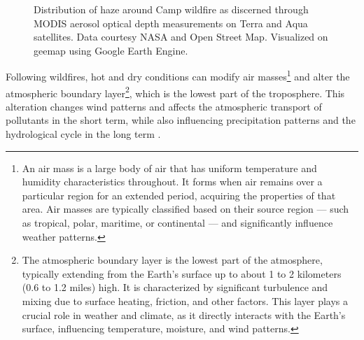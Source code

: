 \documentclass[
  12 pt,
]{Nemilov}
\begin{document}
\begin{figure}

{\centering {}\hfill{}\newline{}\hfill{}\newline

}

\caption[Distribution of haze around Camp wildfire as discerned through MODIS aerosol optical depth measurements on Terra and Aqua satellites.]{Distribution of haze around Camp wildfire as discerned through MODIS aerosol optical depth measurements on Terra and Aqua satellites. Data courtesy NASA and Open Street Map. Visualized on geemap using Google Earth Engine.}\label{fig:ParadiseHaze}
\end{figure}

Following wildfires, hot and dry conditions can modify air masses\footnote{An air mass is a large body of air that has uniform temperature and humidity characteristics throughout. It forms when air remains over a particular region for an extended period, acquiring the properties of that area. Air masses are typically classified based on their source region --- such as tropical, polar, maritime, or continental --- and significantly influence weather patterns.} and alter the atmospheric boundary layer\footnote{The atmospheric boundary layer is the lowest part of the atmosphere, typically extending from the Earth's surface up to about 1 to 2 kilometers (0.6 to 1.2 miles) high. It is characterized by significant turbulence and mixing due to surface heating, friction, and other factors. This layer plays a crucial role in weather and climate, as it directly interacts with the Earth's surface, influencing temperature, moisture, and wind patterns.}, which is the lowest part of the troposphere. This alteration changes wind patterns and affects the atmospheric transport of pollutants in the short term, while also influencing precipitation patterns and the hydrological cycle in the long term \citep{shakesby2006wildfire}.
\end{document}
